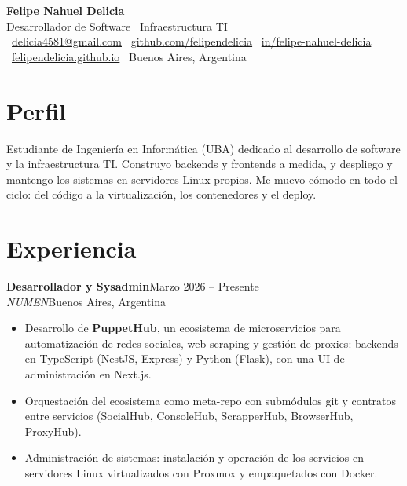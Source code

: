 \documentclass[10pt,a4paper]{article}
\newcommand{\role}[4]{%
  \textbf{#1}\hfill{\color{muted}\small #3}\\[1pt]
  \textit{#2}\hfill{\color{muted}\small #4}\par\vspace{0.25em}
}
\begin{document}
{\Huge\bfseries\color{ink} Felipe Nahuel Delicia}\\[3pt]
{\large\color{accent} Desarrollador de Software \textperiodcentered\ Infraestructura TI}\\[6pt]
{\small
\faEnvelope[regular]~\href{mailto:delicia4581@gmail.com}{delicia4581@gmail.com} \quad
\faGithub~\href{https://github.com/felipendelicia}{github.com/felipendelicia} \quad
\faLinkedin~\href{https://www.linkedin.com/in/felipe-nahuel-delicia/}{in/felipe-nahuel-delicia}\\[2pt]
\faGlobe~\href{https://felipendelicia.github.io/felipendelicia/}{felipendelicia.github.io} \quad
\faMapMarker*~Buenos Aires, Argentina
}

\section{Perfil}
Estudiante de Ingeniería en Informática (UBA) dedicado al desarrollo de software y la infraestructura TI.
Construyo backends y frontends a medida, y despliego y mantengo los sistemas en servidores Linux propios.
Me muevo cómodo en todo el ciclo: del código a la virtualización, los contenedores y el deploy.

\section{Experiencia}

\role{Desarrollador y Sysadmin}{NUMEN}{Marzo 2026 -- Presente}{Buenos Aires, Argentina}
\begin{itemize}
  \item Desarrollo de \textbf{PuppetHub}, un ecosistema de microservicios para automatización de redes sociales, web scraping y gestión de proxies: backends en TypeScript (NestJS, Express) y Python (Flask), con una UI de administración en Next.js.
  \item Orquestación del ecosistema como meta-repo con submódulos git y contratos entre servicios (SocialHub, ConsoleHub, ScrapperHub, BrowserHub, ProxyHub).
  \item Administración de sistemas: instalación y operación de los servicios en servidores Linux virtualizados con Proxmox y empaquetados con Docker.
\end{itemize}
\vspace{0.35em}
\end{document}
